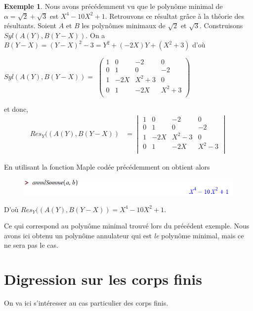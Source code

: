 \documentclass[12pt]{article}
\theoremstyle{definition}\newtheorem{defn}{Définition}
\theoremstyle{definition}\newtheorem{exm}{Exemple}
\theoremstyle{definition}\newtheorem{rem}{Remarque}
\theoremstyle{definition}\newtheorem{algo}{Algorithme}
\theoremstyle{remark}\newtheorem{exo}{Exercice}
\theoremstyle{remark}\newtheorem{nota}{Notation}
\begin{document}
\begin{exm}
Nous avons précédemment vu que le polynôme minimal de $\alpha = \sqrt2 + \sqrt3$ est $X^4 -10X^2 +1$. Retrouvons ce résultat grâce à la théorie des résultants. Soient $A$ et $B$ les polynômes minimaux de $\sqrt2$ et $\sqrt3$. Construisons $Syl(A(Y), B(Y-X))$. On a $B(Y-X) = (Y-X)^2 -3 = Y^2 + (-2X)Y + (X^2+3)$ d'où

\begin{center}
$Syl(A(Y), B(Y-X)) =$
$
   \begin{pmatrix} 
1 & 0 & -2 & 0 \\
0 & 1 & 0 & -2 \\
1 & -2X & X^2 +3 & 0 \\
0 & 1 & -2X & X^2 +3 \\
   \end{pmatrix} 
$
\end{center}

et donc,
			\begin{align*} 
Res_Y((A(Y), B(Y-X))&= \begin{vmatrix} 1 & 0 & -2 & 0 \\ 0 & 1 & 0 & -2 \\ 1 & -2X & X^2 - 3 & 0 \\ 0 & 1 & -2X & X^2 -3 \\\end{vmatrix}
			\end{align*} 
			
En utilisant la fonction Maple codée précédemment on obtient alors

\begin{figure}[h]
\includegraphics[scale=0.65]{code0.png}
\end{figure}

D'où $Res_Y((A(Y), B(Y-X)) = X^4 - 10X^2 + 1$.
\pagebreak

Ce qui correspond au polynôme minimal trouvé lors du précédent exemple. Nous avons ici obtenu un polynôme annulateur qui est \textit{le} polynôme minimal, mais ce ne sera pas  le cas.
\end{exm}

\section{Digression sur les corps finis}

On va ici s'intéresser au cas particulier des corps finis.
\end{document}
